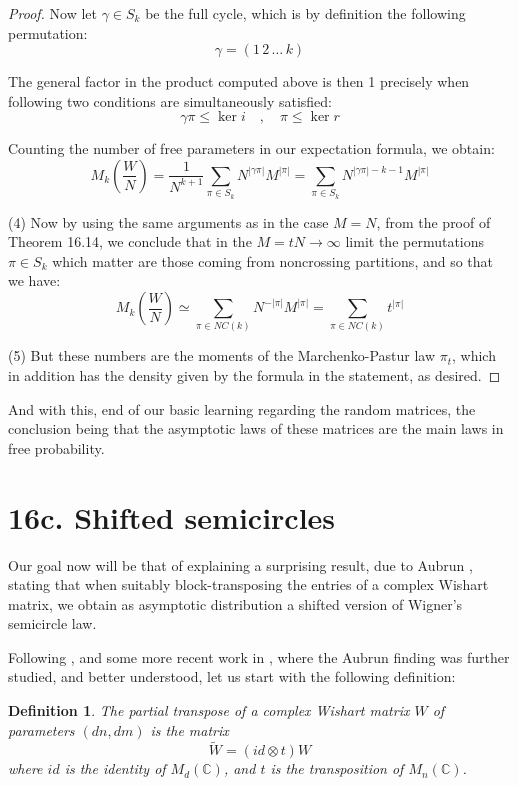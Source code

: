 \documentclass[12pt]{amsbook}
\newtheorem{definition}[theorem]{Definition}
\begin{document}
\begin{proof}
Now let $\gamma\in S_k$ be the full cycle, which is by definition the following permutation:
$$\gamma=(1 \, 2 \, \ldots \, k)$$

The general factor in the product computed above is then 1 precisely when following two conditions are simultaneously satisfied:
$$\gamma\pi\leq\ker i\quad,\quad 
\pi\leq\ker r$$

Counting the number of free parameters in our expectation formula, we obtain:
$$M_k\left(\frac{W}{N}\right)
=\frac{1}{N^{k+1}}\sum_{\pi\in S_k}N^{|\gamma\pi|}M^{|\pi|}
=\sum_{\pi\in S_k}N^{|\gamma\pi|-k-1}M^{|\pi|}$$

(4) Now by using the same arguments as in the case $M=N$, from the proof of Theorem 16.14, we conclude that in the $M=tN\to\infty$ limit the permutations $\pi\in S_k$ which matter are those coming from noncrossing partitions, and so that we have:
$$M_k\left(\frac{W}{N}\right)
\simeq\sum_{\pi\in NC(k)}N^{-|\pi|}M^{|\pi|}
=\sum_{\pi\in NC(k)}t^{|\pi|}$$

(5) But these numbers are the moments of the Marchenko-Pastur law $\pi_t$, which in addition has the density given by the formula in the statement, as desired.
\end{proof}

And with this, end of our basic learning regarding the random matrices, the conclusion being that the asymptotic laws of these matrices are the main laws in free probability.

\section*{16c. Shifted semicircles}

Our goal now will be that of explaining a surprising result, due to Aubrun \cite{aub}, stating that when suitably block-transposing the entries of a complex Wishart matrix, we obtain as asymptotic distribution a shifted version of Wigner's semicircle law. 

\bigskip

Following \cite{aub}, and some more recent work in \cite{bne}, where the Aubrun finding was further studied, and better understood, let us start with the following definition:

\begin{definition}
The partial transpose of a complex Wishart matrix $W$ of parameters $(dn,dm)$ is the matrix
$$\widetilde{W}=(id\otimes t)W$$
where $id$ is the identity of $M_d(\mathbb C)$, and $t$ is the transposition of $M_n(\mathbb C)$. 
\end{definition}
\end{document}
